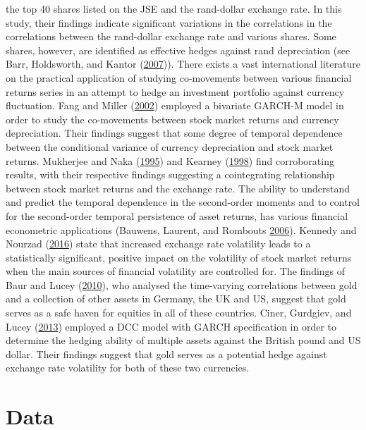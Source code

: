 \documentclass[11pt,preprint, authoryear]{elsarticle}
\numberwithin{equation}{section}
\numberwithin{figure}{section}
\numberwithin{table}{section}
\begin{document}
the top 40 shares listed on the JSE and the rand-dollar exchange rate.
In this study, their findings indicate significant variations in the
correlations in the correlations between the rand-dollar exchange rate
and various shares. Some shares, however, are identified as effective
hedges against rand depreciation (see Barr, Holdsworth, and Kantor
(\protect\hyperlink{ref-barr2007}{2007})). There exists a vast
international literature on the practical application of studying
co-movements between various financial returns series in an attempt to
hedge an investment portfolio against currency fluctuation. Fang and
Miller (\protect\hyperlink{ref-fang2002}{2002}) employed a bivariate
GARCH-M model in order to study the co-movements between stock market
returns and currency depreciation. Their findings suggest that some
degree of temporal dependence between the conditional variance of
currency depreciation and stock market returns. Mukherjee and Naka
(\protect\hyperlink{ref-mukherjee1995}{1995}) and Kearney
(\protect\hyperlink{ref-kearney1998}{1998}) find corroborating results,
with their respective findings suggesting a cointegrating relationship
between stock market returns and the exchange rate. The ability to
understand and predict the temporal dependence in the second-order
moments and to control for the second-order temporal persistence of
asset returns, has various financial econometric applications (Bauwens,
Laurent, and Rombouts \protect\hyperlink{ref-bauwens2006}{2006}).
Kennedy and Nourzad (\protect\hyperlink{ref-kennedy2016}{2016}) state
that increased exchange rate volatility leads to a statistically
significant, positive impact on the volatility of stock market returns
when the main sources of financial volatility are controlled for. The
findings of Baur and Lucey (\protect\hyperlink{ref-baur2010}{2010}), who
analysed the time-varying correlations between gold and a collection of
other assets in Germany, the UK and US, suggest that gold serves as a
safe haven for equities in all of these countries. Ciner, Gurdgiev, and
Lucey (\protect\hyperlink{ref-ciner2013}{2013}) employed a DCC model
with GARCH specification in order to determine the hedging ability of
multiple assets against the British pound and US dollar. Their findings
suggest that gold serves as a potential hedge against exchange rate
volatility for both of these two currencies.

\section{\texorpdfstring{Data \label{Data}}{Data }}\label{data}
\end{document}
